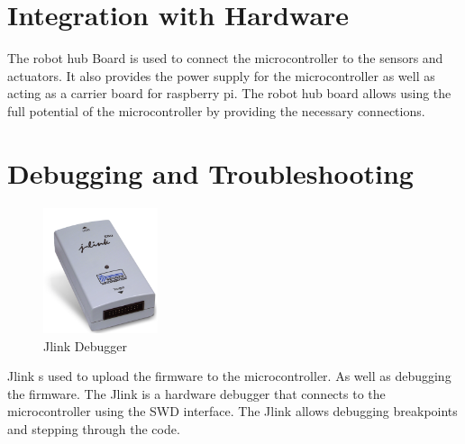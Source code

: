 \section{Integration with Hardware}
The robot hub Board is used to connect the microcontroller to the sensors and actuators. It also provides the power supply for the microcontroller as well as acting as a carrier board for raspberry pi.
The robot hub board allows using the full potential of the microcontroller by providing the necessary connections.


\section{Debugging and Troubleshooting}
\begin {figure}[h]
\centering
\includegraphics[width=0.3\textwidth]{jlink}
\caption{Jlink Debugger}
\label{fig:Jlink}
\end {figure}


Jlink s used to upload the firmware to the microcontroller.
As well as debugging the firmware.
The Jlink is a hardware debugger that connects to the microcontroller using the SWD interface.
The Jlink allows debugging breakpoints and stepping through the code.


